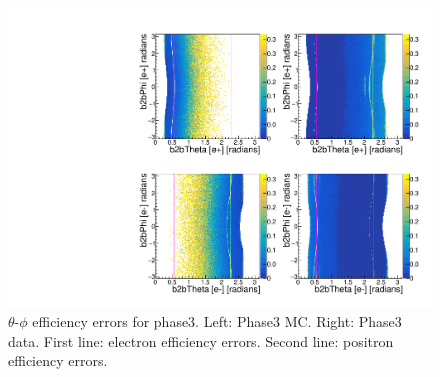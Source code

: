 \documentclass[a4paper,11pt,twosided,final,german,openbib,pdftex,listof=totoc,bibliography=totoc]{scrbook}
\begin{document}
\begin{appendix}
\begin{figure}[!htbp]
	\centering
	\includegraphics[width=\textwidth]{Plots/master3/xCEffTP_MCData_ErrorP3.pdf}
	\caption[$\theta$-$\phi$ Efficiency Error Plots Phase3]{$\theta$-$\phi$ efficiency errors for phase3. Left: Phase3 MC. Right: Phase3 data. First line: electron efficiency errors. Second line: positron efficiency errors.}
	\label{plt:xCEff_Error3}
\end{figure}


\listoffigures
\listoftables

\nocite{*}
\printbibliography[title={Bibliography}]


\end{appendix}
\end{document}
